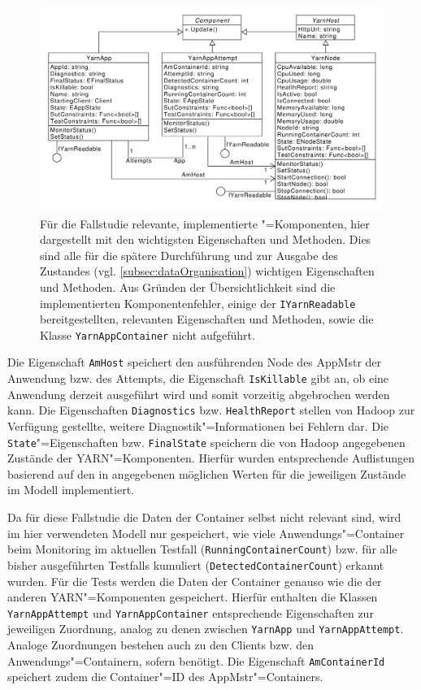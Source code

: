 \begin{figure}[h]
    \includegraphics[width=\columnwidth]{./resources/yarnComponents.pdf}
    \caption[Für die Fallstudie relevante, implementierte "=Komponenten]
        {Für die Fallstudie relevante, implementierte "=Komponenten, hier dargestellt mit den wichtigsten Eigenschaften und Methoden.
        Dies sind alle für die spätere Durchführung und zur Ausgabe des Zustandes (vgl. \cref{subsec:dataOrganisation}) wichtigen Eigenschaften und Methoden.
        Aus Gründen der Übersichtlichkeit sind die implementierten Komponentenfehler, einige der \texttt{IYarnReadable} bereitgestellten, relevanten Eigenschaften und Methoden, sowie die Klasse \texttt{YarnAppContainer} nicht aufgeführt.}
    \label{fig:yarnComponentsClassDiagram}
\end{figure}

Die Eigenschaft \texttt{AmHost} speichert den ausführenden Node des \gls{AppMstr} der \gls{Anwendung} bzw. des Attempts, die Eigenschaft \texttt{IsKillable} gibt an, ob eine \gls{Anwendung} derzeit ausgeführt wird und somit vorzeitig abgebrochen werden kann.
Die Eigenschaften \texttt{Diagnostics} bzw. \texttt{HealthReport} stellen von Hadoop zur Verfügung gestellte, weitere Diagnostik"=Informationen bei Fehlern dar.
Die \texttt{State}"=Eigenschaften bzw. \texttt{FinalState} speichern die von Hadoop angegebenen Zustände der \gls{YARN}"=Komponenten.
Hierfür wurden entsprechende Auflistungen basierend auf den in \cite{HadoopRmApi271} angegebenen möglichen Werten für die jeweiligen Zustände im Modell implementiert.

Da für diese Fallstudie die Daten der \gls{Container} selbst nicht relevant sind, wird im hier verwendeten Modell nur gespeichert, wie viele Anwendungs"=Container beim Monitoring im aktuellen \gls{Testfall} (\texttt{RunningContainerCount}) bzw. für alle bisher ausgeführten \glspl{Testfall} kumuliert (\texttt{DetectedContainerCount}) erkannt wurden.
Für die Tests \cite{Eberhardinger2018} werden die Daten der \gls{Container} genauso wie die der anderen \gls{YARN}"=Komponenten gespeichert.
Hierfür enthalten die Klassen \texttt{YarnAppAttempt} und \texttt{YarnAppContainer} entsprechende Eigenschaften zur jeweiligen Zuordnung, analog zu denen zwischen \texttt{YarnApp} und \texttt{YarnAppAttempt}.
Analoge Zuordnungen bestehen auch zu den Clients bzw. den Anwendungs"=Containern, sofern benötigt.
Die Eigenschaft \texttt{AmContainerId} speichert zudem die Container"=ID des \gls{AppMstr}"=Containers.

